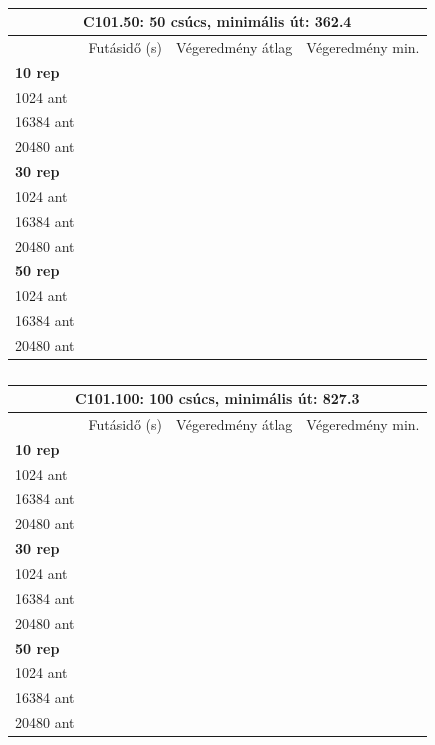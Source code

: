 \begin{table}[ht!]
	\centering
	\begin{tabular}{|p{2cm}||p{3cm}|p{3.5cm}|p{3.5cm}|}
		\hline
		\multicolumn{4}{|c|}{C101.50: 50 csúcs, minimális út: 362.4} \\
		\hline
		& Futásidő (s) & Végeredmény átlag & Végeredmény min.\\
		\hline
		\textbf{10 rep} & & & \\
		1024 ant &  &  &  \\
		16384 ant &  &  &  \\
		20480 ant &  &  &  \\
		\hline
		\textbf{30 rep} &  &  &  \\
		1024 ant &  &  &  \\
		16384 ant &  &  &  \\
		20480 ant &  &  & \\
		\hline
		\textbf{50 rep} &  &  &  \\
		1024 ant &  &  &  \\
		16384 ant &  &  &  \\
		20480 ant &  &  &  \\
		\hline
	\end{tabular}
	\caption{}
	\label{table:VRTPW_50_1}
\end{table}

\begin{table}[ht!]
	\centering
	\begin{tabular}{|p{2cm}||p{3cm}|p{3.5cm}|p{3.5cm}|}
		\hline
		\multicolumn{4}{|c|}{C101.100: 100 csúcs, minimális út: 827.3} \\
		\hline
		& Futásidő (s) & Végeredmény átlag & Végeredmény min.\\
		\hline
		\textbf{10 rep} & & & \\
		1024 ant &  &  &  \\
		16384 ant &  &  &  \\
		20480 ant &  &  &  \\
		\hline
		\textbf{30 rep} &  &  &  \\
		1024 ant &  &  &  \\
		16384 ant &  &  &  \\
		20480 ant &  &  & \\
		\hline
		\textbf{50 rep} &  &  &  \\
		1024 ant &  &  &  \\
		16384 ant &  &  &  \\
		20480 ant &  &  &  \\
		\hline
	\end{tabular}
	\caption{}
	\label{table:VRTPW_100_1}
\end{table}

